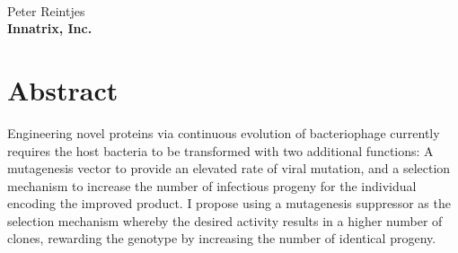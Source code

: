 \documentclass[10pt,letterpaper]{article}
\date{}
\begin{document}
\vspace*{0.2in}

\begin{flushleft}
{\Large
\textbf{} %
}
\newline
\\
Peter Reintjes%
\\
\bigskip
\textbf{Innatrix, Inc.}
\bigskip

% 
%






\end{flushleft}
\section*{Abstract}
Engineering novel proteins via continuous evolution of bacteriophage currently requires the host bacteria to be transformed with two additional functions: A mutagenesis vector to provide an elevated rate of viral mutation, and a selection mechanism to increase the number of infectious progeny for the individual encoding the improved product\cite{pace}.  I propose using a mutagenesis suppressor as the selection mechanism whereby the desired activity results in a higher number of clones, rewarding the genotype by increasing the number of identical progeny.
\end{document}
